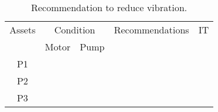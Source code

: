 \begin{table}[!h]
	\caption{Recommendation to reduce vibration.}
	\label{ch045_tbl_vibration_recommendation}
	{\footnotesize
\begin{tabular}{l|l|l|p{8cm}|c}
\hline
\multicolumn{1}{c|}{Assets} & \multicolumn{2}{c|}{Condition} & Recommendations & IT \\ 
\cline{2-3}
\multicolumn{1}{c|}{} & \multicolumn{1}{c|}{Motor} & \multicolumn{1}{c|}{Pump} & \multicolumn{1}{c|}{} &  \\ 
\hline
\multicolumn{1}{c|}{P1} & \multicolumn{1}{c|}{} & \multicolumn{1}{c|}{} &  &  \\ 
\multicolumn{1}{c|}{P2} & \multicolumn{1}{c|}{} & \multicolumn{1}{c|}{} &  &  \\ 
\multicolumn{1}{c|}{P3} & \multicolumn{1}{c|}{} & \multicolumn{1}{c|}{} &  &  \\ 
\hline

\end{tabular}
	}
\end{table}